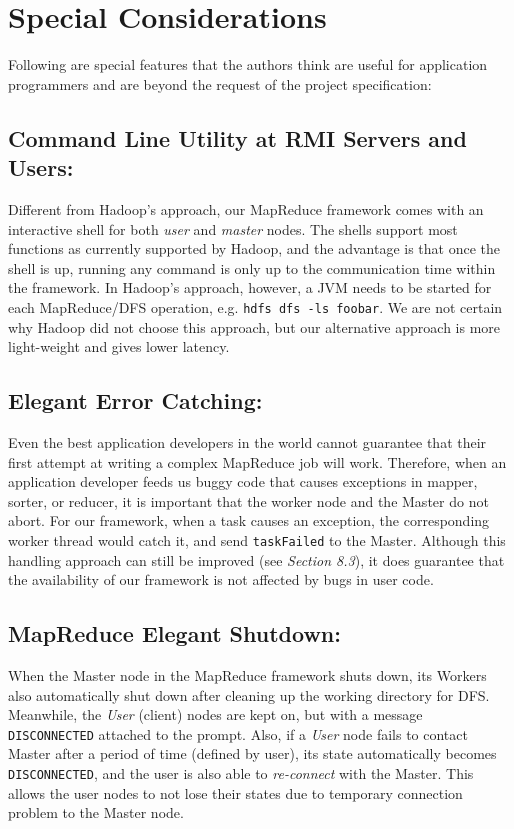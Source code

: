 \documentclass{article} %
\begin{document}
\section{Special Considerations}
\par\qquad Following are special features that the authors think are useful for application programmers and are beyond the request of the project specification:

\subsection{Command Line Utility at RMI Servers and Users:}
    \par\qquad Different from Hadoop's approach, our MapReduce framework comes with an interactive shell for both \emph{user} and \emph{master} nodes. The shells support most functions as currently supported by Hadoop, and the advantage is that once the shell is up, running any command is only up to the communication time within the framework. In Hadoop's approach, however, a JVM needs to be started for each MapReduce/DFS operation, e.g. \texttt{hdfs dfs -ls foobar}. We are not certain why Hadoop did not choose this approach, but our alternative approach is more light-weight and gives lower latency.
\subsection{Elegant Error Catching:}
    \par\qquad Even the best application developers in the world cannot guarantee that their first attempt at writing a complex MapReduce job will work. Therefore, when an application developer feeds us buggy code that causes exceptions in mapper, sorter, or reducer, it is important that the worker node and the Master do not abort. For our framework, when a task causes an exception, the corresponding worker thread would catch it, and send \texttt{taskFailed} to the Master. Although this handling approach can still be improved (see \emph{Section 8.3}), it does guarantee that the availability of our framework is not affected by bugs in user code.
\subsection{MapReduce Elegant Shutdown:}
    \par\qquad When the Master node in the MapReduce framework shuts down, its Workers also automatically shut down after cleaning up the working directory for DFS. Meanwhile, the \emph{User} (client) nodes are kept on, but with a message \texttt{DISCONNECTED} attached to the prompt. Also, if a \emph{User} node fails to contact Master after a period of time (defined by user), its state automatically becomes \texttt{DISCONNECTED}, and the user is also able to \emph{re-connect} with the Master. This allows the user nodes to not lose their states due to temporary connection problem to the Master node.
\end{document}
